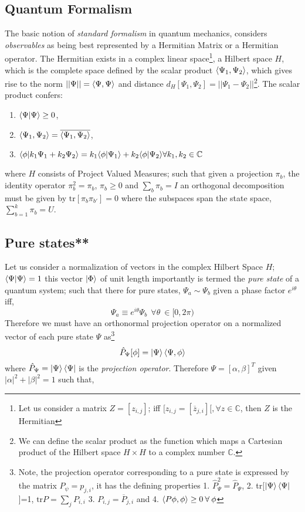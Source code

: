 \documentclass[7pt]{article}
\begin{document}
\subsection{Quantum Formalism}
The basic notion of \emph{standard formalism} in quantum mechanics, considers \emph{observables} as being best represented by a Hermitian Matrix or a Hermitian operator. The Hermitian exists in a complex linear space\footnote{Let us consider a matrix $Z = [z_{i,j}]$; iff $[z_{i,j}
 =  [\overline{z}_{j,i}][,\forall z \in \mathbb{C}$, then $Z$ is the Hermitian}, a Hilbert space $H$, which is the complete space defined by the scalar product $\inn{\Psi_1,\Psi_2}$, which gives rise to the  norm $||\Psi|| = \inn{\Psi,\Psi}$ and distance $d_{H}[\Psi_1,\Psi_2] = ||\Psi_1 - \Psi_2 ||$\footnote{We can define the scalar product as the function which maps a Cartesian product of the Hilbert space $H \times H$ to a complex number $\mathbb{C}$.}. The scalar product confers:
\begin{enumerate}
\item $\inn{\Psi | \Psi} \geq 0$, \\
\item $\inn{\Psi_1,\Psi_2} = \overline{\inn{\Psi_1,\Psi_2}}$, \\
\item $\inn{\phi|k_1 \Psi_1 + k_2 \Psi_2} = k_1\inn{\phi|\Psi_1} + k_2\inn{\phi|\Psi_2} {        }\forall k_1,k_2 \in \mathbb{C}$
\end{enumerate}
where $H$ consists of Project Valued Measures; such that given a projection $\pi_b$, the identity operator $\pi_b^2 = \pi_b$, $\pi_b \geq 0$ and $\sum_{b} \pi_b = I$  an orthogonal decomposition must be given by $\text{tr}[ \pi_b \pi_{b'} ] = 0$ where the subspaces span the state space, $\sum_{b=1}^{k} \pi_b = U$.
\subsection{Pure states**}
Let us consider a normalization of vectors in the complex Hilbert Space $H$;
$
\braket{\Psi} = 1
$
this vector $\ket{\Phi}$ of unit length importantly is termed the \emph{pure state} of a quantum system; such that there for pure states, $\Psi_a \sim \Psi_b$ given a phase factor $e^{i \theta}$ iff,
$$
\Psi_a \equiv e^{i\theta}\Psi_b \: \: \forall \theta \: \in [0,2 \pi)
$$
Therefore we must have an orthonormal projection operator on a normalized vector of each pure state $\Psi$ as\footnote{Note, the projection operator corresponding to a pure state is expressed by the matrix $P_{\psi} = {p}_{j,i}$, it has the defining properties 1. $\hat{P}_{\Psi}^2 = \hat{P}_{\Psi}$, 2. tr[$\ket{\Psi}\bra{\Psi}$]=1, \st{$ \text{tr} P = \sum_j {P}_{i,i}$}  3. ${P}_{i,j} = \overline{{P}}_{j,i}$ and 4. $\inn{P\phi,\phi} \geq 0 \: \forall \: \phi$}
$$
\hat{P}_{\Psi}[ \phi] = \ket{\Psi}\inn{\Psi,\phi}
$$
where $\hat{P}_{\Psi} = \ket{\Psi}\bra{\Psi}$ is the \emph{projection operator}. Therefore $\Psi = [\alpha , \beta ]^T$ given $|\alpha|^2 +  |\beta|^2 = 1$ such that,
\end{document}
